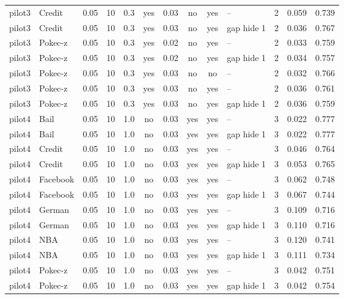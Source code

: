 \begin{table}[tbp]
\begin{adjustbox}{max width=\textwidth}
\begin{tabular}{llccccccclccc}
pilot3 & Credit & 0.05 & 10 & 0.3 & yes & 0.03 & no & yes & -- & 2 & 0.059 & 0.739 \\
pilot3 & Credit & 0.05 & 10 & 0.3 & yes & 0.03 & no & yes & gap hide 1 & 2 & 0.036 & 0.767 \\
pilot3 & Pokec-z & 0.05 & 10 & 0.3 & yes & 0.02 & no & yes & -- & 2 & 0.033 & 0.759 \\
pilot3 & Pokec-z & 0.05 & 10 & 0.3 & yes & 0.02 & no & yes & gap hide 1 & 2 & 0.034 & 0.757 \\
pilot3 & Pokec-z & 0.05 & 10 & 0.3 & yes & 0.03 & no & no & -- & 2 & 0.032 & 0.766 \\
pilot3 & Pokec-z & 0.05 & 10 & 0.3 & yes & 0.03 & no & yes & -- & 2 & 0.036 & 0.761 \\
pilot3 & Pokec-z & 0.05 & 10 & 0.3 & yes & 0.03 & no & yes & gap hide 1 & 2 & 0.036 & 0.759 \\
pilot4 & Bail & 0.05 & 10 & 1.0 & no & 0.03 & yes & yes & -- & 3 & 0.022 & 0.777 \\
pilot4 & Bail & 0.05 & 10 & 1.0 & no & 0.03 & yes & yes & gap hide 1 & 3 & 0.022 & 0.777 \\
pilot4 & Credit & 0.05 & 10 & 1.0 & no & 0.03 & yes & yes & -- & 3 & 0.046 & 0.764 \\
pilot4 & Credit & 0.05 & 10 & 1.0 & no & 0.03 & yes & yes & gap hide 1 & 3 & 0.053 & 0.765 \\
pilot4 & Facebook & 0.05 & 10 & 1.0 & no & 0.03 & yes & yes & -- & 3 & 0.062 & 0.748 \\
pilot4 & Facebook & 0.05 & 10 & 1.0 & no & 0.03 & yes & yes & gap hide 1 & 3 & 0.067 & 0.744 \\
pilot4 & German & 0.05 & 10 & 1.0 & no & 0.03 & yes & yes & -- & 3 & 0.109 & 0.716 \\
pilot4 & German & 0.05 & 10 & 1.0 & no & 0.03 & yes & yes & gap hide 1 & 3 & 0.110 & 0.716 \\
pilot4 & NBA & 0.05 & 10 & 1.0 & no & 0.03 & yes & yes & -- & 3 & 0.120 & 0.741 \\
pilot4 & NBA & 0.05 & 10 & 1.0 & no & 0.03 & yes & yes & gap hide 1 & 3 & 0.111 & 0.734 \\
pilot4 & Pokec-z & 0.05 & 10 & 1.0 & no & 0.03 & yes & yes & -- & 3 & 0.042 & 0.751 \\
pilot4 & Pokec-z & 0.05 & 10 & 1.0 & no & 0.03 & yes & yes & gap hide 1 & 3 & 0.042 & 0.754 \\
\bottomrule
\end{tabular}
\end{adjustbox}
\end{table}
